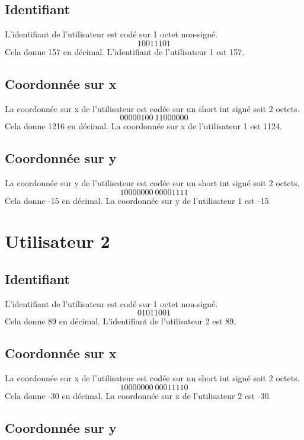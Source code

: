 \documentclass{article}
\begin{document}
\subsection{Identifiant}

L'identifiant de l'utilisateur est codé sur 1 octet non-signé.
\[10011101\]
Cela donne 157 en décimal. L'identifiant de l'utilisateur 1 est 157.

\subsection{Coordonnée sur x}

La coordonnée sur x de l'utilisateur est codée sur un short int signé soit 2 octets.
\[00000100 \ 11000000\]
Cela donne 1216 en décimal. La coordonnée sur x de l'utilisateur 1 est 1124.

\subsection{Coordonnée sur y}

La coordonnée sur y de l'utilisateur est codée sur un short int signé soit 2 octets.
\[10000000 \ 00001111\]
Cela donne -15 en décimal. La coordonnée sur y de l'utilisateur 1 est -15.

\section{Utilisateur 2}

\subsection{Identifiant}

L'identifiant de l'utilisateur est codé sur 1 octet non-signé.
\[01011001\]
Cela donne 89 en décimal. L'identifiant de l'utilisateur 2 est 89.

\subsection{Coordonnée sur x}

La coordonnée sur x de l'utilisateur est codée sur un short int signé soit 2 octets.
\[10000000 \ 00011110\]
Cela donne -30 en décimal. La coordonnée sur x de l'utilisateur 2 est -30.

\subsection{Coordonnée sur y}
\end{document}
